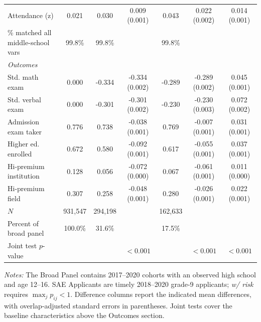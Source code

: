 \begin{table}[H]
\begin{tabular}{@{}lcccccc@{}}
Attendance (z) & 0.021 & 0.030 & 0.009 (0.001) & 0.043 & 0.022 (0.002) & 0.014 (0.001) \\
\quad\footnotesize{\% matched all middle-school vars} & \footnotesize{99.8\%} & \footnotesize{99.8\%} &  & \footnotesize{99.8\%} &  &  \\
\midrule
\multicolumn{7}{l}{\textit{Outcomes}} \\[2pt]
Std. math exam & 0.000 & -0.334 & -0.334 (0.002) & -0.289 & -0.289 (0.002) & 0.045 (0.001) \\
Std. verbal exam & 0.000 & -0.301 & -0.301 (0.002) & -0.230 & -0.230 (0.003) & 0.072 (0.002) \\
Admission exam taker & 0.776 & 0.738 & -0.038 (0.001) & 0.769 & -0.007 (0.001) & 0.031 (0.001) \\
Higher ed. enrolled & 0.672 & 0.580 & -0.092 (0.001) & 0.617 & -0.055 (0.001) & 0.037 (0.001) \\
Hi-premium institution & 0.128 & 0.056 & -0.072 (0.000) & 0.067 & -0.061 (0.001) & 0.011 (0.000) \\
Hi-premium field & 0.307 & 0.258 & -0.048 (0.001) & 0.280 & -0.026 (0.001) & 0.022 (0.001) \\
\midrule
$N$ & 931,547 & 294,198 & & 162,633 & & \\
Percent of broad panel & 100.0\% & 31.6\% & & 17.5\% & & \\
Joint test $p$-value & & & $<0.001$ & & $<0.001$ & $<0.001$ \\
\bottomrule
\end{tabular}
\par\medskip\footnotesize
\begin{minipage}{\textwidth}
\textit{Notes:} The Broad Panel contains 2017--2020 cohorts with an observed high school and age 12--16. SAE Applicants are timely 2018--2020 grade-9 applicants; \textit{w/ risk} requires $\max_j p_{ij}<1$. Difference columns report the indicated mean differences, with overlap-adjusted standard errors in parentheses. Joint tests cover the baseline characteristics above the Outcomes section.
\end{minipage}
\end{table}
